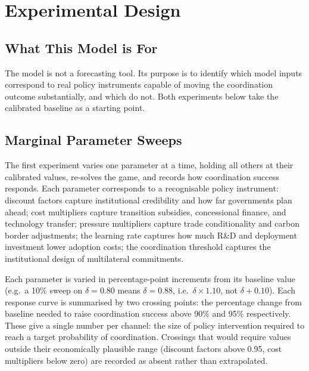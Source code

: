 \documentclass[10pt,a4paper]{article}
\begin{document}
\clearpage
\needspace{12em}
\section{Experimental Design}

\needspace{12em}
\subsection{What This Model is For}

The model is not a forecasting tool. Its purpose is to identify which model inputs correspond to real policy instruments capable of moving the coordination outcome substantially, and which do not. Both experiments below take the calibrated baseline as a starting point.

\needspace{8em}
\subsection{Marginal Parameter Sweeps}

The first experiment varies one parameter at a time, holding all others at their calibrated values, re-solves the game, and records how coordination success responds. Each parameter corresponds to a recognisable policy instrument: discount factors capture institutional credibility and how far governments plan ahead; cost multipliers capture transition subsidies, concessional finance, and technology transfer; pressure multipliers capture trade conditionality and carbon border adjustments; the learning rate captures how much R\&D and deployment investment lower adoption costs; the coordination threshold captures the institutional design of multilateral commitments.

Each parameter is varied in percentage-point increments from its baseline value (e.g.\ a 10\% sweep on $\delta = 0.80$ means $\delta = 0.88$, i.e.\ $\delta \times 1.10$, not $\delta + 0.10$). Each response curve is summarised by two crossing points: the percentage change from baseline needed to raise coordination success above 90\% and 95\% respectively. These give a single number per channel: the size of policy intervention required to reach a target probability of coordination. Crossings that would require values outside their economically plausible range (discount factors above 0.95, cost multipliers below zero) are recorded as absent rather than extrapolated.
\end{document}
